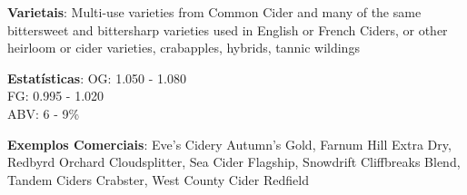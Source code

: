 \textbf{Varietais}: Multi-use varieties from Common Cider and many of the same bittersweet and bittersharp varieties used in English or French Ciders, or other heirloom or cider varieties, crabapples, hybrids, tannic wildings

\textbf{Estatísticas}: OG: 1.050 - 1.080 \\
\phantom{ } \hspace{16.5mm} FG: 0.995 - 1.020 \\
\phantom{ } \hspace{16.5mm} ABV: 6 - 9\%

\textbf{Exemplos Comerciais}: Eve's Cidery Autumn's Gold, Farnum Hill Extra Dry, Redbyrd Orchard Cloudsplitter, Sea Cider Flagship, Snowdrift Cliffbreaks Blend, Tandem Ciders Crabster, West County Cider Redfield